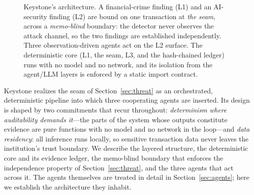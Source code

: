 \documentclass[10pt,twocolumn]{article}
\begin{document}
\begin{figure}[t]
\caption{Keystone's architecture. A financial-crime finding (L1) and an
AI-security finding (L2) are bound on one transaction at \emph{the seam}, across
a \emph{memo-blind} boundary: the detector never observes the attack channel, so
the two findings are established independently. Three observation-driven agents
act on the L2 surface. The deterministic core (L1, the seam, L3, and the
hash-chained ledger) runs with no model and no network, and its isolation from
the agent/LLM layers is enforced by a static import contract.}
\label{fig:arch}
\end{figure}

Keystone realizes the seam of Section~\ref{sec:threat} as an orchestrated, deterministic
pipeline into which three cooperating agents are inserted. Its design is shaped
by two commitments that recur throughout: \emph{determinism where auditability
demands it}---the parts of the system whose outputs constitute evidence are pure
functions with no model and no network in the loop---and \emph{data residency}:
all inference runs locally, so sensitive transaction data never leaves the
institution's trust boundary. We describe the layered structure, the
deterministic core and its evidence ledger, the memo-blind boundary that
enforces the independence property of Section~\ref{sec:threat}, and the three agents that act
across it. The agents themselves are treated in detail in Section~\ref{sec:agents}; here we
establish the architecture they inhabit.
\end{document}

